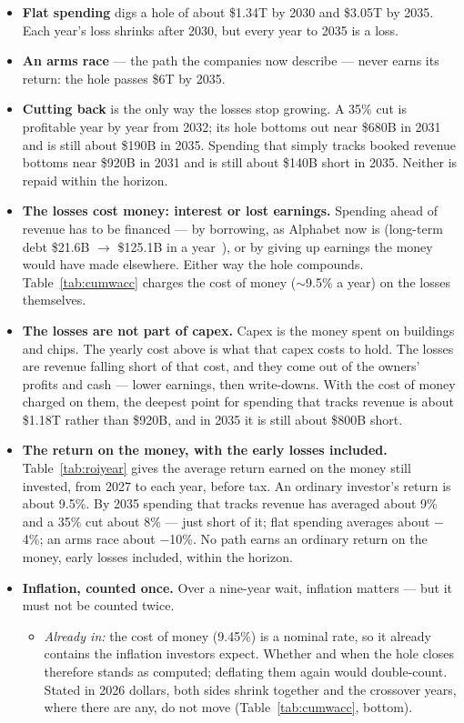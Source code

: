\documentclass[11pt,letterpaper]{article}
\begin{document}
\begin{itemize}
\item \textbf{Flat spending} digs a hole of about \$1.34T by 2030 and \$3.05T by 2035. Each year's loss shrinks after 2030, but every year to 2035 is a loss.
\item \textbf{An arms race} --- the path the companies now describe --- never earns its return: the hole passes \$6T by 2035.
\item \textbf{Cutting back} is the only way the losses stop growing. A 35\% cut is profitable year by year from 2032; its hole bottoms out near \$680B in 2031 and is still about \$190B in 2035. Spending that simply tracks booked revenue bottoms near \$920B in 2031 and is still about \$140B short in 2035. Neither is repaid within the horizon.
\item \textbf{The losses cost money: interest or lost earnings.} Spending ahead of revenue has to be financed --- by borrowing, as Alphabet now is (long-term debt \$21.6B $\to$ \$125.1B in a year~\cite{ref:yahoo_nasdaq_1029}), or by giving up earnings the money would have made elsewhere. Either way the hole compounds. Table~\ref{tab:cumwacc} charges the cost of money ($\sim$9.5\% a year) on the losses themselves.
\item \textbf{The losses are not part of capex.} Capex is the money spent on buildings and chips. The yearly cost above is what that capex costs to hold. The losses are revenue falling short of that cost, and they come out of the owners' profits and cash --- lower earnings, then write-downs. With the cost of money charged on them, the deepest point for spending that tracks revenue is about \$1.18T rather than \$920B, and in 2035 it is still about \$800B short.
\item \textbf{The return on the money, with the early losses included.} Table~\ref{tab:roiyear} gives the average return earned on the money still invested, from 2027 to each year, before tax. An ordinary investor's return is about 9.5\%. By 2035 spending that tracks revenue has averaged about 9\% and a 35\% cut about 8\% --- just short of it; flat spending averages about $-$4\%; an arms race about $-$10\%. No path earns an ordinary return on the money, early losses included, within the horizon.
\item \textbf{Inflation, counted once.} Over a nine-year wait, inflation matters --- but it must not be counted twice.
  \begin{itemize}
  \item \emph{Already in:} the cost of money (9.45\%) is a nominal rate, so it already contains the inflation investors expect. Whether and when the hole closes therefore stands as computed; deflating them again would double-count. Stated in 2026 dollars, both sides shrink together and the crossover years, where there are any, do not move (Table~\ref{tab:cumwacc}, bottom).

\end{itemize}
\end{itemize}
\end{document}
